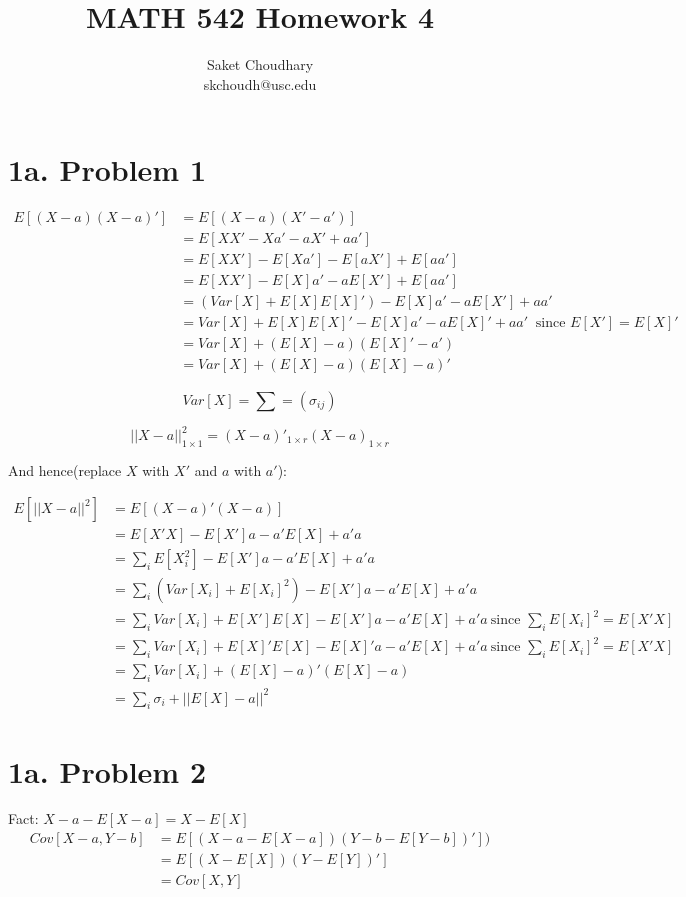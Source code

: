 \documentclass[a4paper]{article}
\title{MATH 542 Homework 4}
\author{Saket Choudhary\\skchoudh@usc.edu}
\begin{document}
\maketitle 
\section*{1a. Problem 1}

\begin{align*}
E[(X-a)(X-a)']&= E[(X-a)(X'-a')]\\
&= E[XX'-Xa'-aX'+aa']\\
&= E[XX']-E[Xa']-E[aX']+E[aa']\\
&= E[XX']-E[X]a'-aE[X']+E[aa']\\
&= (Var[X]+E[X]E[X]')-E[X]a'-aE[X']+aa'\\
&= Var[X]+ E[X]E[X]'-E[X]a'-aE[X]'+aa'\ \text{ since } E[X']=E[X]'\\
&= Var[X] + (E[X]-a)(E[X]'-a')\\
&= Var[X] + (E[X]-a)(E[X]-a)'
\end{align*}

$$Var[X] = \sum = (\sigma_{ij})$$

$$||X-a||_{1\times 1}^2 = (X-a)'_{1 \times r}(X-a)_{1 \times r}$$

And hence(replace $X$ with $X'$ and $a$ with $a'$):

\begin{align*}
E[||X-a||^2] &= E[(X-a)'(X-a)]\\
&= E[X'X]-E[X']a-a'E[X]+a'a\\
&= \sum_i E[X_i^2]-E[X']a-a'E[X]+a'a\\
&= \sum_i (Var[X_i]+E[X_i]^2)-E[X']a-a'E[X]+a'a\\
&= \sum_i Var[X_i]+ E[X']E[X]-E[X']a-a'E[X]+a'a\ \text{since } \sum_i E[X_i]^2 = E[X'X]\\
&=\sum_i Var[X_i]+ E[X]'E[X]-E[X]'a-a'E[X]+a'a\ \text{since } \sum_i E[X_i]^2 = E[X'X]\\
&= \sum_i Var[X_i] + (E[X]-a)'(E[X]-a)\\
&= \sum_i \sigma_i + ||E[X]-a||^2
\end{align*}

\section*{1a. Problem 2}
Fact: $X-a-E[X-a]=X-E[X]$
\begin{align*}
Cov[X-a,Y-b] &= E[(X-a-E[X-a])(Y-b-E[Y-b])'])\\
&= E[(X-E[X])(Y-E[Y])']\\
&= Cov[X,Y]
\end{align*}
\end{document}
